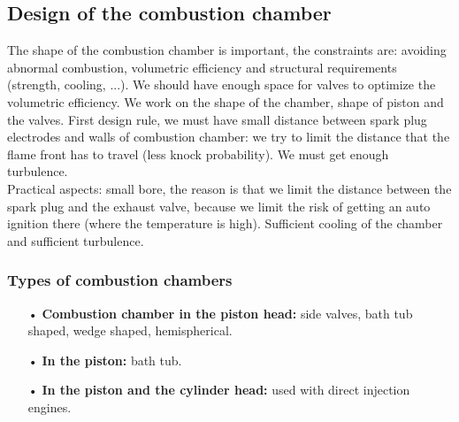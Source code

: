 \subsection{Design of the combustion chamber}
	The shape of the combustion chamber is important, the constraints are: avoiding abnormal combustion, volumetric efficiency and structural requirements (strength, cooling, ...). We should have enough space for valves to optimize the volumetric efficiency. We work on the shape of the chamber, shape of piston and the valves. First design rule, we must have small distance between spark plug electrodes and walls of combustion chamber: we try to limit the distance that the flame front has to travel (less knock probability). We must get enough turbulence. \\
	
	Practical aspects: small bore, the reason is that we limit the distance between the spark plug and the exhaust valve, because we limit the risk of getting an auto ignition there (where the temperature is high). Sufficient cooling of the chamber and sufficient turbulence. 
	
\subsubsection{Types of combustion chambers}
	\begin{itemize}
	\item[•] \textbf{Combustion chamber in the piston head:} side valves, bath tub shaped, wedge shaped, hemispherical.
	\item[•] \textbf{In the piston:} bath tub.
	\item[•] \textbf{In the piston and the cylinder head:} used with direct injection engines. 
	\end{itemize}
	

